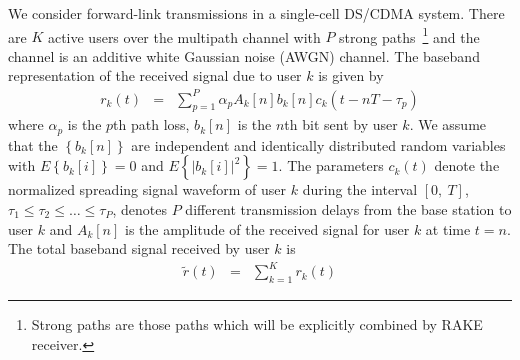 \documentclass[a4paper,10pt,fleqn, twocolumn]{IEEETran}
\begin{document}
We consider forward-link transmissions in a single-cell DS/CDMA
system. There are $K$ active users over the multipath channel with
$P$ strong paths~\footnote{Strong paths are those paths which will
be explicitly combined by RAKE receiver.} and the channel is an
additive white Gaussian noise (AWGN) channel. The baseband
representation of the received signal due to user $k$ is given by
\begin{equation}
\begin{array}{rcl}
r_k(t)&=&\sum\limits_{p=1}^{P}\alpha_pA_k[n]
b_k[n]c_k(t-nT-\tau_p)
\end{array}
\end{equation}
\noindent where $\alpha_p$ is the $p$th path loss, $b_k{[n]}$ is
the $n$th bit sent by user $k$. We assume that the
$\left\{b_k{[n]}\right\}$ are independent and identically
distributed random variables with $E\left\{b_k{[i]}\right\}=0$ and
$E\left\{|b_k{[i]}|^2\right\}=1$. The parameters $c_k(t)$ denote
the normalized spreading signal waveform of user $k$ during the
interval $[0,\ T]$, $\tau_1\leq\tau_2\leq\ldots\leq\tau_P$,
denotes $P$ different transmission delays from the base station to
user $k$ and $A_k[n]$ is the amplitude of the received signal for
user $k$ at time $t=n$. The total baseband signal received by user
$k$ is
\begin{equation}
\begin{array}{rcl}
\tilde{r}(t)&=&\sum\limits_{k=1}^{K}r_k(t)
\end{array}
\end{equation}
\end{document}
